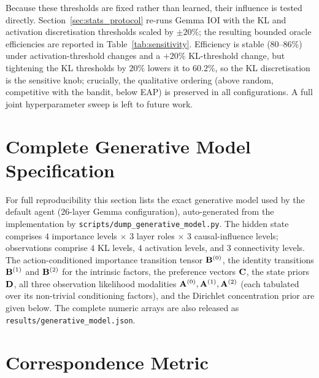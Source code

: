 Because these thresholds are fixed rather than learned, their
influence is tested directly. Section~\ref{sec:stats_protocol} re-runs Gemma IOI with the KL
and activation discretisation thresholds scaled by $\pm 20\%$; the resulting bounded
oracle efficiencies are reported in Table~\ref{tab:sensitivity}. Efficiency is stable
(80--86\%) under activation-threshold changes and a $+20\%$ KL-threshold change, but
tightening the KL thresholds by $20\%$ lowers it to $60.2\%$, so the KL discretisation
is the sensitive knob; crucially, the qualitative ordering (above random, competitive
with the bandit, below EAP) is preserved in all configurations. A full joint
hyperparameter sweep is left to future work.


\section{Complete Generative Model Specification}
\label{app:generative_model}

For full reproducibility this section lists the exact generative model used by the
default agent ($26$-layer Gemma configuration), auto-generated from the
implementation by
\texttt{scripts/\allowbreak dump\_\allowbreak generative\_\allowbreak model.py}. The hidden state comprises
$4$ importance levels $\times$ $3$ layer roles $\times$ $3$ causal-influence levels;
observations comprise $4$ KL levels, $4$ activation levels, and $3$ connectivity
levels. The action-conditioned importance transition tensor $\mathbf{B}^{(0)}$, the
identity transitions $\mathbf{B}^{(1)}$ and $\mathbf{B}^{(2)}$ for the intrinsic factors,
the preference vectors $\mathbf{C}$, the state priors $\mathbf{D}$, all three observation
likelihood modalities $\mathbf{A}^{(0)},\mathbf{A}^{(1)},\mathbf{A}^{(2)}$ (each tabulated
over its non-trivial conditioning factors), and the Dirichlet concentration prior
are given below. The complete numeric arrays are also released as
\texttt{results/generative\_model.json}.




\section{Correspondence Metric}
\label{app:correspondence}

